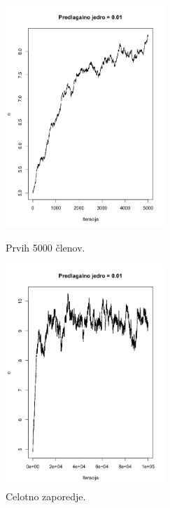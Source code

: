 \documentclass[a4paper,11pt]{article}
\begin{document}
    \begin{figure}[ht!]
        \begin{minipage}{0.5\textwidth}
            \centering
            \includegraphics[width = 60mm]{Slike/4dod_S.png}
            \caption{Prvih 5000 členov.}
        \end{minipage}
        \begin{minipage}{0.5\textwidth}
            \centering
            \includegraphics[width = 60mm]{Slike/4dod_celotno.png}
            \caption{Celotno zaporedje.}
        \end{minipage}
    \end{figure}
\newpage
\end{document}
